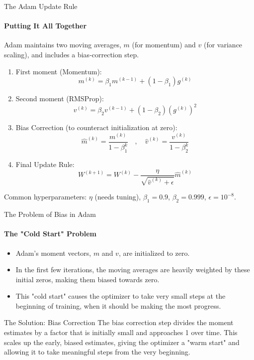 \begin{frame}{The Adam Update Rule}
    \framesubtitle{Putting It All Together}
    \small
    Adam maintains two moving averages, $m$ (for momentum) and $v$ (for variance scaling), and includes a bias-correction step.
    \begin{enumerate}
        \item First moment (Momentum):
            $$ m^{(k)} = \beta_1 m^{(k-1)} + (1-\beta_1) g^{(k)} $$
        \item Second moment (RMSProp):
            $$ v^{(k)} = \beta_2 v^{(k-1)} + (1-\beta_2) (g^{(k)})^2 $$
        \item Bias Correction (to counteract initialization at zero):
            $$ \hat{m}^{(k)} = \frac{m^{(k)}}{1 - \beta_1^k} \quad , \quad \hat{v}^{(k)} = \frac{v^{(k)}}{1 - \beta_2^k} $$
        \item Final Update Rule:
            $$ W^{(k+1)} = W^{(k)} - \frac{\eta}{\sqrt{\hat{v}^{(k)} + \epsilon}} \hat{m}^{(k)} $$
    \end{enumerate}
    \footnotesize{Common hyperparameters: $\eta$ (needs tuning), $\beta_1=0.9$, $\beta_2=0.999$, $\epsilon=10^{-8}$.}
\end{frame}

\begin{frame}{The Problem of Bias in Adam}
    \framesubtitle{The "Cold Start" Problem}
    \begin{itemize}
        \item Adam's moment vectors, $m$ and $v$, are initialized to zero.
        \item In the first few iterations, the moving averages are heavily weighted by these initial zeros, making them biased towards zero.
        \item This "cold start" causes the optimizer to take very small steps at the beginning of training, when it should be making the most progress.
    \end{itemize}
    \begin{alertblock}{The Solution: Bias Correction}
        The bias correction step divides the moment estimates by a factor that is initially small and approaches 1 over time. This scales up the early, biased estimates, giving the optimizer a "warm start" and allowing it to take meaningful steps from the very beginning.
    \end{alertblock}
\end{frame}

